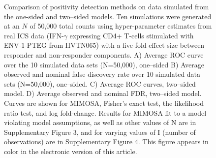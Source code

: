 \documentclass[12pt,oupdraft]{biostatistics}
\begin{document}
\begin{figure}
%
   \caption{Comparison of positivity detection methods on data simulated from the one-sided and two--sided models. Ten simulations were generated at an $N$ of 50,000 total counts using hyper-parameter estimates from real ICS data (IFN-$\gamma$ expressing CD4+ T-cells stimulated with ENV-1-PTEG from HVTN065) with a five-fold effect size between responder and non-responder components. A) Average ROC curve over the 10 simulated data sets (N=50,000), one--sided B) Average observed and nominal false discovery rate over 10 simulated data sets (N=50,000), one--sided. C) Average ROC curves, two--sided model. D) Average observed and nominal FDR, two--sided model. Curves are shown for MIMOSA, Fisher's exact test, the likelihood ratio test, and log fold-change. Results for MIMOSA fit to a model violating model assumptions, as well as other values of N are in Supplementary Figure 3, and for varying values of I (number of observations) are in Supplementary Figure 4. This figure appears in color in the electronic version of this article.}\label{fig:simulations}
\end{figure}
\end{document}
